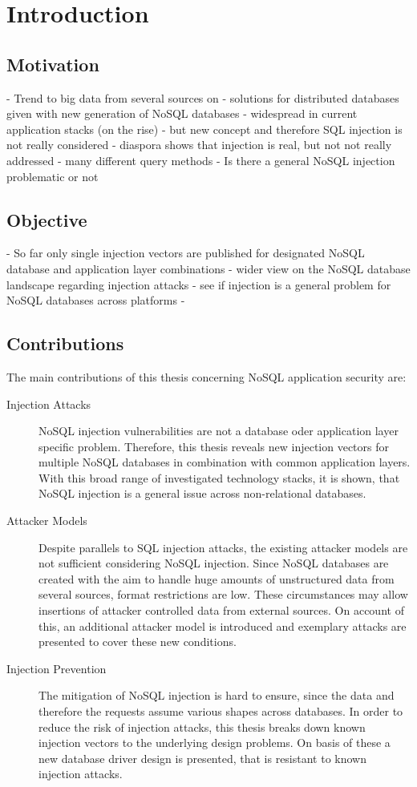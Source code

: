 \chapter{Introduction}
\label{cha:introduction}

\section{Motivation}
- Trend to big data from several sources on 
- solutions for distributed databases given with new generation of NoSQL databases
- widespread in current application stacks (on the rise)
- but new concept and therefore SQL injection is not really considered
- diaspora shows that injection is real, but not not really addressed
- many different query methods
- Is there a general NoSQL injection problematic or not

\section{Objective}

- So far only single injection vectors are published for designated NoSQL database and application layer combinations
- wider view on the NoSQL database landscape regarding injection attacks
- see if injection is a general problem for NoSQL databases across platforms
- 


\section{Contributions}

The main contributions of this thesis concerning NoSQL application security are:
\begin{description}
\item [Injection Attacks] NoSQL injection vulnerabilities are not a database oder application layer specific problem. Therefore, this thesis reveals new injection vectors for multiple NoSQL databases in combination with common application layers. With this broad range of investigated technology stacks, it is shown, that NoSQL injection is a general issue across non-relational databases.
\item [Attacker Models] Despite parallels to SQL injection attacks, the existing attacker models are not sufficient considering NoSQL injection. Since NoSQL databases are created with the aim to handle huge amounts of unstructured data from several sources, format restrictions are low. These circumstances may allow insertions of attacker controlled data from external sources. On account of this, an additional attacker model is introduced and exemplary attacks are presented to cover these new conditions.
\item [Injection Prevention] The mitigation of NoSQL injection is hard to ensure, since the data and therefore the requests assume various shapes across databases. In order to reduce the risk of injection attacks, this thesis breaks down known injection vectors to the underlying design problems. On basis of these a new database driver design is presented, that is resistant to known injection attacks.
\end{description}

